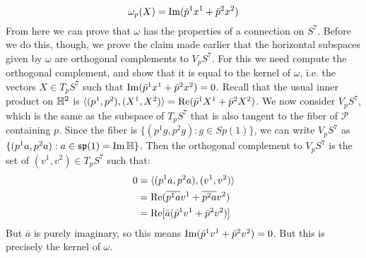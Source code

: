 \[       \omega_p(X) = \operatorname{Im}(\bar p^1 x^1 + \bar p^2 x^2)  \]
From here we can prove that $\omega$ has the properties of a connection on $S^7$. Before we do this, though, we prove the claim made earlier that the horizontal subspaces given by $\omega$ are orthogonal complements to $V_p S^7$. For this we need compute the orthogonal complement, and show that it is equal to the kernel of $\omega$, i.e. the vectors $X \in T_p S^7$ such that $\operatorname{Im}(\bar p^1 x^1 + \bar p^2 x^2) = 0$. Recall that the usual inner product on $\mathbb{H}^2$ is $\langle  (p^1, p^2) , (X^1, X^2) \rangle = \operatorname{Re}(\bar p^1 X^1 + \bar p^2 X^2)$. We now consider $V_p S^7$, which is the same as the subspace of $T_p S^7$ that is also tangent to the fiber of $\mathcal{P}$ containing $p$. Since the fiber is $\{ (p^1 g, p^2 g) : g\in Sp(1) \}$, we can write $V_p S^7$ as $\{ (p^1 a, p^2 a) : a \in \mathfrak{sp}(1) = \operatorname{Im} \mathbb{H} \}$. Then the orthogonal complement to $V_p S^7$ is the set of $(v^1, v^2) \in T_p S^7$ such that:
\begin{align*}
0 &= \langle (p^1 a, p^2 a), (v^1, v^2) \rangle \\
&= \operatorname{Re}(\overline{p^1 a} v^1 + \overline{p^2 a} v^2) \\
&= \operatorname{Re}[\bar a (\bar p^1 v^1 + \bar p^2 v^2)]
\end{align*}
But $\bar a$ is purely imaginary, so this means $\operatorname{Im}(\bar p^1 v^1 + \bar p^2 v^2) = 0$. But this is precisely the kernel of $\omega$.

